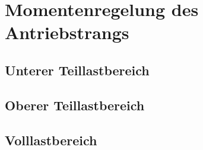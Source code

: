 \section{Momentenregelung des Antriebstrangs} \label{regelung}

\subsection{Unterer Teillastbereich}

\subsection{Oberer Teillastbereich}

\subsection{Volllastbereich}